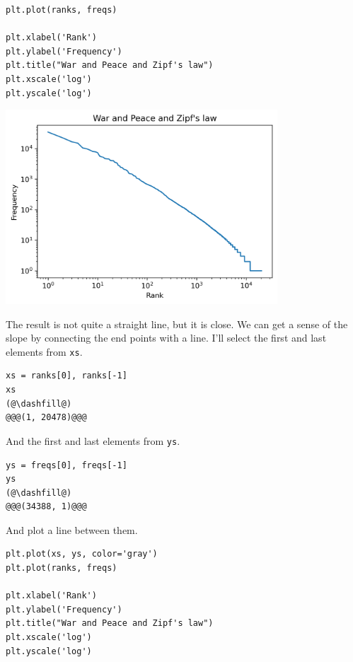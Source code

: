 \begin{lstlisting}[]
plt.plot(ranks, freqs)

plt.xlabel('Rank')
plt.ylabel('Frequency')
plt.title("War and Peace and Zipf's law")
plt.xscale('log')
plt.yscale('log')
\end{lstlisting}

\begin{center}
\includegraphics[width=4in]{06_plotting_files/06_plotting_78_0.png}
\end{center}

The result is not quite a straight line, but it is close. We can get a
sense of the slope by connecting the end points with a line. I'll select
the first and last elements from \passthrough{\lstinline!xs!}.

\begin{lstlisting}[]
xs = ranks[0], ranks[-1]
xs
(@\dashfill@)
@@@(1, 20478)@@@
\end{lstlisting}

And the first and last elements from \passthrough{\lstinline!ys!}.

\begin{lstlisting}[]
ys = freqs[0], freqs[-1]
ys
(@\dashfill@)
@@@(34388, 1)@@@
\end{lstlisting}

And plot a line between them.

\begin{lstlisting}[]
plt.plot(xs, ys, color='gray')
plt.plot(ranks, freqs)

plt.xlabel('Rank')
plt.ylabel('Frequency')
plt.title("War and Peace and Zipf's law")
plt.xscale('log')
plt.yscale('log')
\end{lstlisting}

